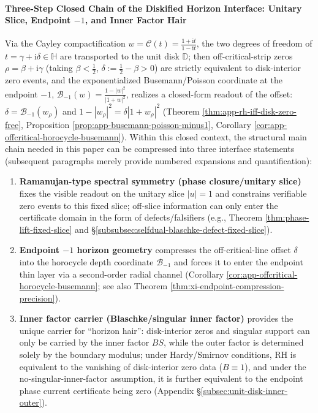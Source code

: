 \paragraph{Three-Step Closed Chain of the Diskified Horizon Interface: Unitary Slice, Endpoint \texorpdfstring{$-1$}{-1}, and Inner Factor Hair}
Via the Cayley compactification
\(
w=\mathcal{C}(t)=\frac{1+\mathrm{i}t}{1-\mathrm{i}t}
\),
the two degrees of freedom of \(t=\gamma+\mathrm{i}\delta\in\mathbb{H}\) are transported to the unit disk \(\mathbb{D}\); then off-critical-strip zeros
\(\rho=\beta+\mathrm{i}\gamma\) (taking \(\beta<\tfrac12\), \(\delta:=\tfrac12-\beta>0\))
are strictly equivalent to disk-interior zero events, and the exponentialized Busemann/Poisson coordinate at the endpoint \(-1\),
\(\mathcal{B}_{-1}(w)=\frac{1-|w|^{2}}{|1+w|^{2}}\), realizes a closed-form readout of the offset:
\(
\delta=\mathcal{B}_{-1}(w_\rho)
\)
and
\(
1-|w_\rho|^{2}=\delta|1+w_\rho|^{2}
\)
(Theorem \ref{thm:app-rh-iff-disk-zero-free}, Proposition \ref{prop:app-busemann-poisson-minus1}, Corollary \ref{cor:app-offcritical-horocycle-busemann}).
Within this closed context, the structural main chain needed in this paper can be compressed into three interface statements (subsequent paragraphs merely provide numbered expansions and quantification):
{\renewcommand{\labelenumi}{(\roman{enumi})}
\begin{enumerate}
  \item \textbf{Ramanujan-type spectral symmetry (phase closure/unitary slice)} fixes the visible readout on the unitary slice \(|u|=1\) and constrains verifiable zero events to this fixed slice; off-slice information can only enter the certificate domain in the form of defects/falsifiers (e.g., Theorem \ref{thm:phase-lift-fixed-slice} and \S\ref{subsubsec:selfdual-blaschke-defect-fixed-slice}).
  \item \textbf{Endpoint \texorpdfstring{$-1$}{-1} horizon geometry} compresses the off-critical-line offset \(\delta\) into the horocycle depth coordinate \(\mathcal{B}_{-1}\) and forces it to enter the endpoint thin layer via a second-order radial channel (Corollary \ref{cor:app-offcritical-horocycle-busemann}; see also Theorem \ref{thm:xi-endpoint-compression-precision}).
  \item \textbf{Inner factor carrier (Blaschke/singular inner factor)} provides the unique carrier for ``horizon hair'': disk-interior zeros and singular support can only be carried by the inner factor \(BS\), while the outer factor is determined solely by the boundary modulus; under Hardy/Smirnov conditions, RH is equivalent to the vanishing of disk-interior zero data (\(B\equiv 1\)), and under the no-singular-inner-factor assumption, it is further equivalent to the endpoint phase current certificate being zero (Appendix \S\ref{subsec:unit-disk-inner-outer}).
\end{enumerate}}
